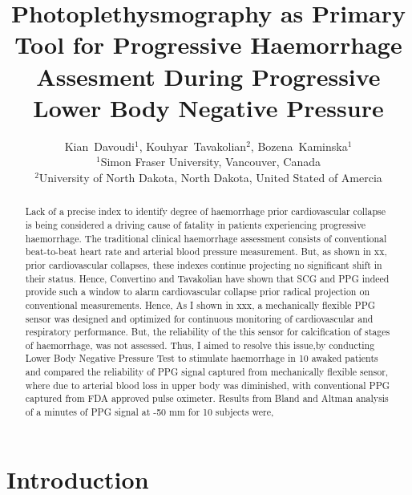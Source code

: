 \documentclass[twocolumn]{cinc}
\begin{document}


\title{Photoplethysmography  as Primary Tool for Progressive Haemorrhage Assesment During Progressive Lower Body Negative Pressure}
\author{Kian~Davoudi$^{1}$, Kouhyar~Tavakolian$^2$, Bozena~Kaminska$^1$ 
\\[1em]
        $^1$Simon Fraser University, Vancouver, Canada \\[.25ex]
        $^2$University of North Dakota, North Dakota, United Stated of Amercia\\[1em]
}

\maketitle






\begin{abstract}
Lack of a precise index to identify degree of  haemorrhage prior cardiovascular collapse is being considered a driving cause of fatality in patients experiencing progressive haemorrhage. The traditional clinical haemorrhage assessment consists of conventional beat-to-beat heart rate and arterial blood pressure measurement. But, as shown in xx, prior cardiovascular collapses,  these indexes continue projecting no significant shift in their status. Hence, Convertino and Tavakolian have shown that SCG and PPG indeed provide such a window to alarm cardiovascular collapse prior radical projection on conventional measurements. Hence, As I shown in xxx, a mechanically flexible PPG sensor was designed and optimized for continuous monitoring of cardiovascular and respiratory performance. But, the reliability of the this sensor for calcification of stages of haemorrhage, was not assessed. Thus, I aimed to resolve this issue,by conducting Lower Body Negative Pressure Test to stimulate haemorrhage in 10 awaked patients and compared the reliability of PPG signal captured from mechanically flexible sensor, where due to arterial blood loss in upper body was diminished, with conventional PPG captured from FDA approved pulse oximeter. Results from Bland and Altman analysis of  a minutes of PPG signal at -50 mm for 10 subjects were, 


\end{abstract}


\section{Introduction}
\end{document}
